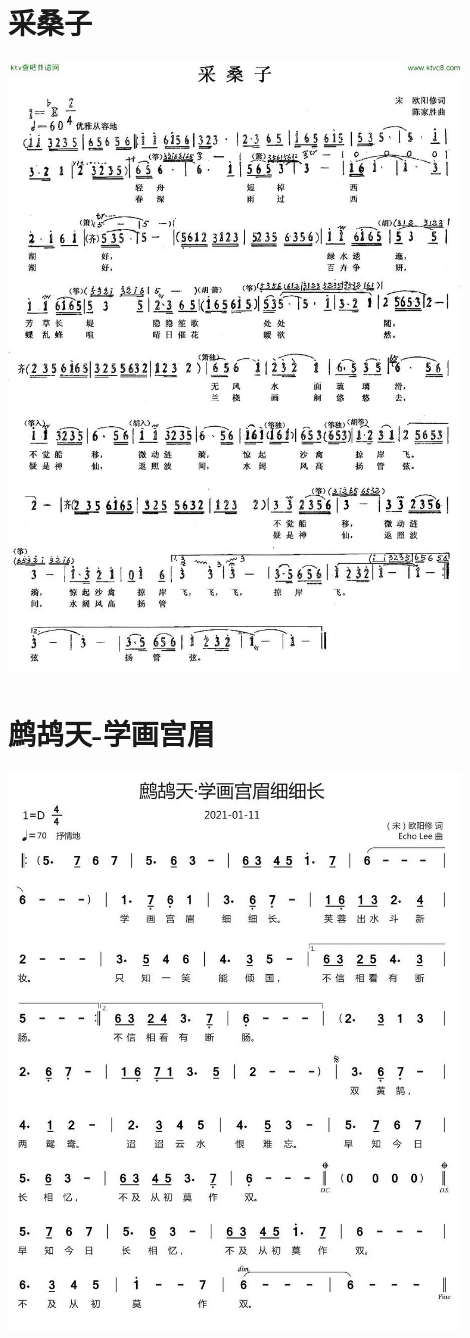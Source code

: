 \documentclass[cn,pad,twocol]{elegantbook}
\begin{document}
\section{采桑子} \includegraphics[width=0.9\textwidth]{rpi400/20210212欧阳修-采桑子.jpg}
\section{鹧鸪天-学画宫眉} \includegraphics[width=0.9\textwidth]{rpi400/20210212欧阳修-鹧鸪天·学画宫眉细细长.jpg}
\end{document}
